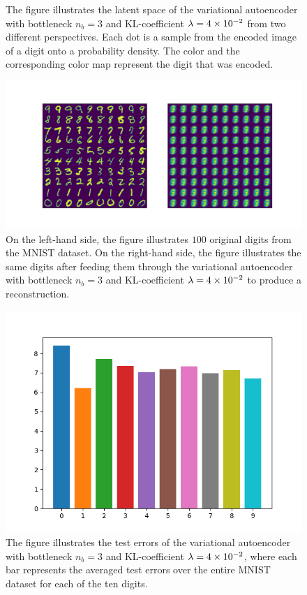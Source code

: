 \begin{figure}
\begin{center}
\begin{minipage}[b]{0.49\linewidth}
	\end{minipage}
\end{center}
\caption{The figure illustrates the latent space of the variational autoencoder with bottleneck $n_b=3$ and KL-coefficient $\lambda = \num{4e-2}$ from two different perspectives. Each dot is a sample from the encoded image of a digit onto a probability density. The color and the corresponding color map represent the digit that was encoded.}\label{fig:convolutional_VAE_snd_KL_4e-2_10k_epochs_3D_latent}
\end{figure}


\begin{figure}
\begin{center}
      \includegraphics[trim = 15mm 10mm 15mm 15mm, clip, width=\linewidth]{convolutional_VAE_snd_KL_4e-2_10k_epochs_3D_inference}
\end{center}
\caption{On the left-hand side, the figure illustrates $100$ original digits from the MNIST dataset. On the right-hand side, the figure illustrates the same digits after feeding them through the variational autoencoder with bottleneck $n_b=3$ and KL-coefficient $\lambda=\num{4e-2}$ to produce a reconstruction.}\label{fig:convolutional_VAE_snd_KL_4e-2_10k_epochs_3D_inference}
\end{figure}


\begin{figure}
\begin{center}
      \includegraphics[width=0.49\linewidth]{convolutional_VAE_snd_KL_4e-2_10k_epochs_3D_errors}
\end{center}
\caption{The figure illustrates the test errors of the variational autoencoder with bottleneck $n_b=3$ and KL-coefficient $\lambda = \num{4e-2}$, where each bar represents the averaged test errors over the entire MNIST dataset for each of the ten digits.}\label{fig:convolutional_VAE_snd_KL_4e-2_10k_epochs_3D_errors}
\end{figure}


